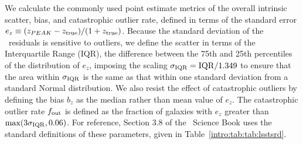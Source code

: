 We calculate the commonly used point estimate metrics of the overall intrinsic scatter, bias, and catastrophic outlier rate, defined in terms of the standard error $e_{z} \equiv (z_{PEAK} - z_{\rm true}) / (1 + z_{\rm true})$.
Because the standard deviation of the \pz\ residuals is sensitive to outliers, we define the scatter in terms of the Interquartile Range (IQR), the difference between the 75th and 25th percentiles of the distribution of $e_{z}$, imposing the scaling $\sigma_{\rm IQR} = \rm{IQR} / 1.349$ to ensure that the area within $\sigma_{\rm IQR}$ is the same as that within one standard deviation from a standard Normal distribution.
We also resist the effect of catastrophic outliers by defining the bias $b_{z}$ as the median rather than mean value of $e_{z}$.
The catastrophic outlier rate $f_{\rm out}$ is defined as the fraction of galaxies with $e_{z}$ greater than $\max(3 \sigma_{\rm IQR}, 0.06)$.
For reference, Section 3.8 of the \lsst\ Science Book \citep{lsst_science_collaboration_lsst_2009} uses the standard definitions of these parameters, given in Table~\ref{intro:tab:tab:lsstsrd}.
